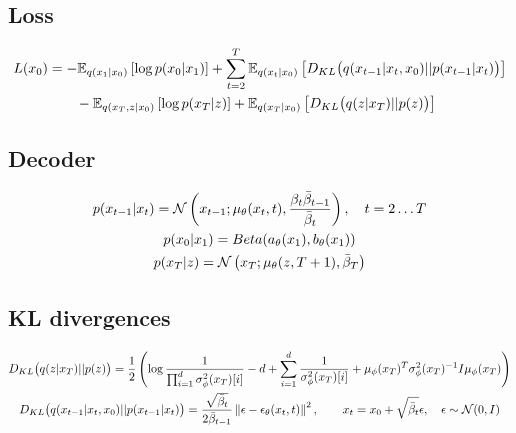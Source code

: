 \subsection{Loss}

\begin{align}
    L(x_0) &=
    -
    \mathbb E_{q(x_1|x_0)}\left[
    \log p(x_0|x_1)\right]
    +
    \sum_{t=2}^T \mathbb E_{q(x_t|x_0)}\left[D_{KL}\big(q(x_{t-1}|x_t, x_0)||p(x_{t-1}|x_t)\big)\right]\\
    &\qquad
    -
    \mathbb E_{q(x_T,z|x_0)}\left[
    \log p(x_T|z)\right]
    +
    \mathbb E_{q(x_T|x_0)}\left[
    D_{KL}\big(q(z|x_T)||p(z)\big)\right]
\end{align}


\subsection{Decoder}
\begin{gather}
p(x_{t-1}|x_t)
=\N\left(
x_{t-1};
\mu_\theta(x_t,t),
\frac{\beta_t \bar\beta_{t-1}}{\bar\beta_{t}}
\right),
\quad t=2\hdots T
\\
%
p(x_0|x_1)=Beta(a_\theta(x_1),b_\theta(x_1))\\
%
p(x_T|z)=\N\left(x_T;\mu_\theta(z,T+1),\bar\beta_T\right)
\end{gather}

\subsection{KL divergences}
\begin{gather}
D_{KL}\big(q(z|x_T)||p(z)\big)
=
\frac{1}{2}\left(
\log \frac{1}{\prod_{i=1}^d\sigma^2_\phi(x_T)[i]}
-d
+
\sum_{i=1}^d \frac{1}{\sigma^2_\phi(x_T)[i]}
+
\mu_\phi(x_T)^T \sigma^2_\phi(x_T)^{-1} I \mu_\phi(x_T)
\right)\\
%
D_{KL}\big(q(x_{t-1}|x_t, x_0)||p(x_{t-1}|x_t)\big)
=
\frac{\sqrt{\bar\beta_t}}{2\bar\beta_{t-1}}
\norm{
\epsilon
     -\epsilon_\theta(x_t,t)
     }^2,\qquad x_t=x_0 + \sqrt{\bar\beta_t}\epsilon, \quad \epsilon\sim\N(0,I)\\
\end{gather}

